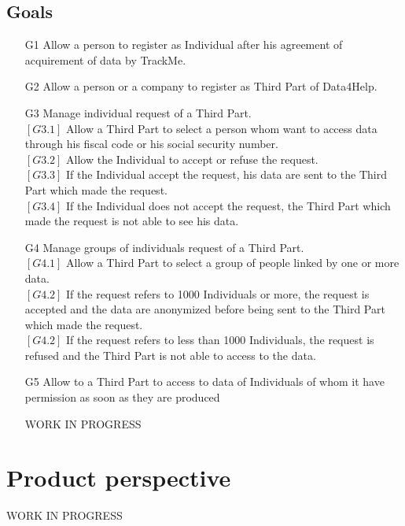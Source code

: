 \documentclass{report}
\begin{document}
			\subsection{Goals}
			\begin{itemize}
				\item[G1] Allow a person to register as Individual after his agreement of acquirement of data by TrackMe.
				
				\item[G2] Allow a person or a company to register as Third Part of Data4Help.

				\item[G3] Manage individual request of a Third Part.\\
				$\left[G3.1\right]$ Allow a Third Part to select a person whom want to access data through his fiscal code or his social security number.\\
				$\left[G3.2\right]$ Allow the Individual to accept or refuse the request.\\
				$\left[G3.3\right]$ If the Individual accept the request, his data are sent to the Third Part which made the request.\\
				$\left[G3.4\right]$ If the Individual does not accept the request, the Third Part which made the request is not able to see his data.
				
				\item[G4] Manage groups of individuals request of a Third Part.\\
				$\left[G4.1\right]$ Allow a Third Part to select a group of people linked by one or more data.\\
				$\left[G4.2\right]$ If the request refers to 1000 Individuals or more, the request is accepted and the data are anonymized before being sent to the Third Part which made the request.\\
				$\left[G4.2\right]$ If the request refers to less than 1000 Individuals, the request is refused and the Third Part is not able to access to the data.
				
				\item[G5] Allow to a Third Part to access to data of Individuals of whom it have permission as soon as they are produced
				
			WORK IN PROGRESS
			\end{itemize}

		\section{Product perspective}
		WORK IN PROGRESS
\end{document}
